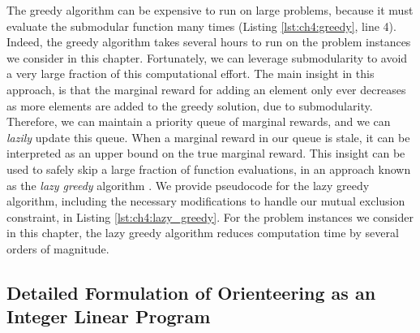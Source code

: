 \begin{Listing}[t]
\begin{algorithmic}[1]




    \ENDWHILE



    
    \ENDFOR

\ENDFOR


\end{algorithmic}
\end{Listing}

The greedy algorithm can be expensive to run on large problems, because it must evaluate the submodular function many times (Listing \ref{lst:ch4:greedy}, line 4).
Indeed, the greedy algorithm takes several hours to run on the problem instances we consider in this chapter. 
Fortunately, we can leverage submodularity to avoid a very large fraction of this computational effort.
The main insight in this approach, is that the marginal reward for adding an element only ever decreases as more elements are added to the greedy solution, due to submodularity.
Therefore, we can maintain a priority queue of marginal rewards, and we can \emph{lazily} update this queue.
When a marginal reward in our queue is stale, it can be interpreted as an upper bound on the true marginal reward. 
This insight can be used to safely skip a large fraction of function evaluations, in an approach known as the \emph{lazy greedy} algorithm \cite{krause:2014}.
We provide pseudocode for the lazy greedy algorithm, including the necessary modifications to handle our mutual exclusion constraint, in Listing \ref{lst:ch4:lazy_greedy}.
For the problem instances we consider in this chapter, the lazy greedy algorithm reduces computation time by several orders of magnitude.

\subsection{Detailed Formulation of Orienteering as an Integer Linear Program}
\label{sec:ch4:ilp_detail}

